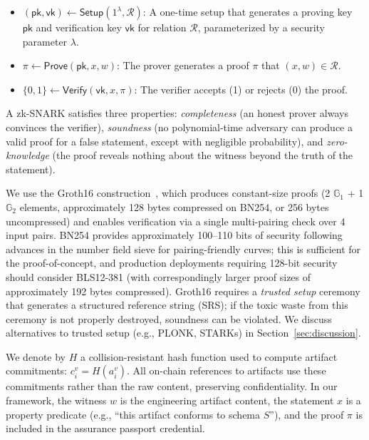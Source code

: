 \begin{itemize}
    \item $(\mathsf{pk}, \mathsf{vk}) \leftarrow \textsf{Setup}(1^\lambda, \mathcal{R})$: A one-time setup that generates a proving key $\mathsf{pk}$ and verification key $\mathsf{vk}$ for relation $\mathcal{R}$, parameterized by a security parameter $\lambda$.
    \item $\pi \leftarrow \textsf{Prove}(\mathsf{pk}, x, w)$: The prover generates a proof $\pi$ that $(x, w) \in \mathcal{R}$.
    \item $\{0, 1\} \leftarrow \textsf{Verify}(\mathsf{vk}, x, \pi)$: The verifier accepts (1) or rejects (0) the proof.
\end{itemize}

A zk-SNARK satisfies three properties: \emph{completeness} (an honest prover always convinces the verifier), \emph{soundness} (no polynomial-time adversary can produce a valid proof for a false statement, except with negligible probability), and \emph{zero-knowledge} (the proof reveals nothing about the witness beyond the truth of the statement).

We use the Groth16 construction~\cite{groth2016size}, which produces constant-size proofs (2 $\mathbb{G}_1$ + 1 $\mathbb{G}_2$ elements, approximately 128 bytes compressed on BN254, or 256 bytes uncompressed) and enables verification via a single multi-pairing check over 4 input pairs.
BN254 provides approximately 100--110 bits of security following advances in the number field sieve for pairing-friendly curves; this is sufficient for the proof-of-concept, and production deployments requiring 128-bit security should consider BLS12-381 (with correspondingly larger proof sizes of approximately 192 bytes compressed).
Groth16 requires a \emph{trusted setup} ceremony that generates a structured reference string (SRS); if the toxic waste from this ceremony is not properly destroyed, soundness can be violated.
We discuss alternatives to trusted setup (e.g., PLONK, STARKs) in Section~\ref{sec:discussion}.

We denote by $H$ a collision-resistant hash function used to compute artifact commitments: $c_i^{v} = H(a_i^{v})$.
All on-chain references to artifacts use these commitments rather than the raw content, preserving confidentiality.
In our framework, the witness $w$ is the engineering artifact content, the statement $x$ is a property predicate (e.g., ``this artifact conforms to schema $S$''), and the proof $\pi$ is included in the assurance passport credential.

